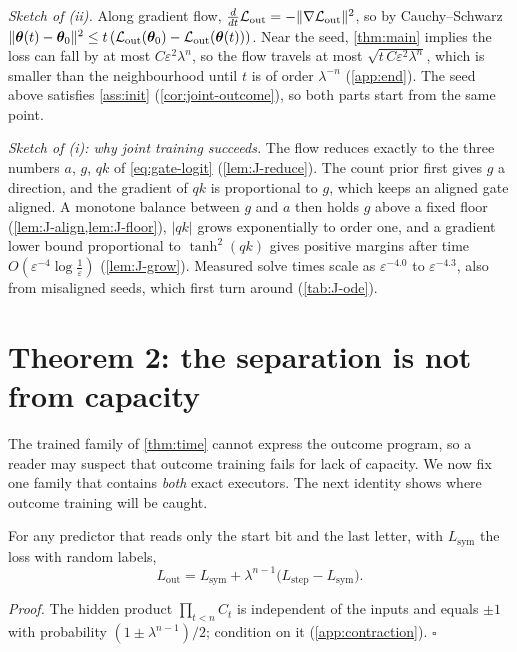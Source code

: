 \emph{Sketch of (ii).} Along gradient flow, $\frac{d}{dt}\mathcal L_{\mathrm{out}}=-\|\nabla\mathcal L_{\mathrm{out}}\|^2$, so by Cauchy--Schwarz
$\|\bm\theta(t)-\bm\theta_0\|^2\le t\,(\mathcal L_{\mathrm{out}}(\bm\theta_0)-\mathcal L_{\mathrm{out}}(\bm\theta(t)))$. Near the seed, \cref{thm:main} implies the loss can fall
by at most $C\varepsilon^2\lambda^n$, so the flow travels at most $\sqrt{t\,C\varepsilon^2\lambda^n}$, which is smaller than the
neighbourhood until $t$ is of order $\lambda^{-n}$ (\cref{app:end}). The seed above satisfies \cref{ass:init}
(\cref{cor:joint-outcome}), so both parts start from the same point.

\emph{Sketch of (i): why joint training succeeds.} The flow reduces exactly to the three numbers $a$, $g$, $qk$ of
\cref{eq:gate-logit} (\cref{lem:J-reduce}). The count prior first gives $g$ a direction, and the gradient of $qk$ is proportional to
$g$, which keeps an aligned gate aligned. A monotone balance between $g$ and $a$ then holds
$g$ above a fixed floor (\cref{lem:J-align,lem:J-floor}), $|qk|$ grows exponentially to order one, and a gradient lower bound
proportional to $\tanh^2(qk)$ gives positive margins after time $O(\varepsilon^{-4}\log\frac1\varepsilon)$ (\cref{lem:J-grow}). Measured solve
times scale as $\varepsilon^{-4.0}$ to $\varepsilon^{-4.3}$, also from misaligned seeds, which first turn around (\cref{tab:J-ode}).

\section{Theorem 2: the separation is not from capacity}
\label{sec:matched}
\label{sec:two-path-trap}

The trained family of \cref{thm:time} cannot express the outcome program, so a reader may suspect that outcome training
fails for lack of capacity. We now fix one family that contains \emph{both} exact executors. The next identity shows where
outcome training will be caught.

\begin{lemma}
\label{lem:binary-loss-mixture}
For any predictor that reads only the start bit and the last letter, with $L_{\mathrm{sym}}$ the loss with random labels,
\begin{equation}
 L_{\mathrm{out}}=L_{\mathrm{sym}}+\lambda^{n-1}\bigl(L_{\mathrm{step}}-L_{\mathrm{sym}}\bigr).
 \label{eq:binary-loss-mixture}
\end{equation}
\end{lemma}
\emph{Proof.} The hidden product $\prod_{t<n}C_t$ is independent of the inputs and equals $\pm1$ with probability
$(1\pm\lambda^{n-1})/2$; condition on it (\cref{app:contraction}). \hfill$\square$


